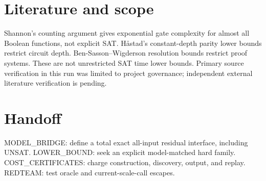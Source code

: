 \documentclass{article}
\begin{document}
\section*{Literature and scope}
Shannon's counting argument gives exponential gate complexity for almost all Boolean functions, not explicit SAT. H\aa stad's constant-depth parity lower bounds restrict circuit depth. Ben-Sasson--Wigderson resolution bounds restrict proof systems. These are not unrestricted SAT time lower bounds. Primary source verification in this run was limited to project governance; independent external literature verification is pending.
\section*{Handoff}
MODEL\_BRIDGE: define a total exact all-input residual interface, including UNSAT. LOWER\_BOUND: seek an explicit model-matched hard family. COST\_CERTIFICATES: charge construction, discovery, output, and replay. REDTEAM: test oracle and current-scale-call escapes.
\end{document}

